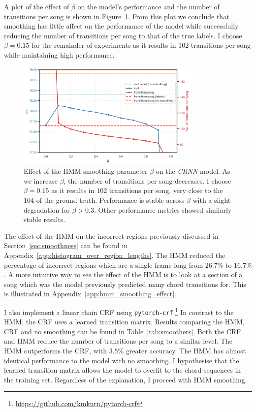A plot of the effect of $\beta$ on the model's performance and the number of transitions per song is shown in Figure~\ref{fig:hmm_beta_search}. From this plot we conclude that smoothing has little affect on the performance of the model while successfully reducing the number of transitions per song to that of the true labels. I choose $\beta = 0.15$ for the remainder of experiments as it results in $102$ transitions per song while maintaining high performance. 

\begin{figure}[ht]
    \centering
    \includegraphics[width=0.8\textwidth]{figures/hmm_beta_vs_root_transitions.png}
    \caption{Effect of the HMM smoothing parameter $\beta$ on the \emph{CRNN} model. As we increase $\beta$, the number of transitions per song decreases. I choose $\beta = 0.15$ as it results in $102$ transitions per song, very close to the $104$ of the ground truth. Performance is stable across $\beta$ with a slight degradation for $\beta > 0.3$. Other performance metrics showed similarly stable results. }\label{fig:hmm_beta_search}
\end{figure}

The effect of the HMM on the incorrect regions previously discussed in Section~\ref{sec:smoothness} can be found in Appendix~\ref{app:histogram_over_region_lengths}. The HMM reduced the percentage of incorrect regions which are a single frame long from $26.7\%$ to $16.7\%$. A more intuitive way to see the effect of the HMM is to look at a section of a song which was the model previously predicted many chord transitions for. This is illustrated in Appendix~\ref{app:hmm_smoothing_effect}.

I also implement a linear chain CRF using \texttt{pytorch-crf}.\footnote{\url{https://github.com/kmkurn/pytorch-crf}} In contrast to the HMM, the CRF uses a learned transition matrix. Results comparing the HMM, CRF and no smoothing can be found in Table~\ref{tab:smoothers}. Both the CRF and HMM reduce the number of transitions per song to a similar level. The HMM outperforms the CRF, with $3.5\%$ greater accuracy. The HMM has almost identical performance to the model with no smoothing. I hypothesise that the learned transition matrix allows the model to overfit to the chord sequences in the training set. Regardless of the explanation, I proceed with HMM smoothing.

